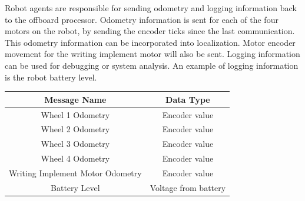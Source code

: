 Robot agents are responsible for sending odometry and logging information back to the offboard processor. Odometry information is sent for each of the four motors on the robot, by sending the encoder ticks since the last communication. This odometry information can be incorporated into localization. Motor encoder movement for the writing implement motor will also be sent. Logging information can be used for debugging or system analysis. An example of logging information is the robot battery level.  \\
\begin{center}
 \begin{tabular}{||c c ||}
 \hline
 Message Name & Data Type \\ [0.5ex]
 \hline\hline
 Wheel 1 Odometry & Encoder value \\
 \hline
 Wheel 2 Odometry & Encoder value \\
 \hline
 Wheel 3 Odometry & Encoder value \\
 \hline
 Wheel 4 Odometry & Encoder value \\
 \hline
 Writing Implement Motor Odometry & Encoder value \\
 \hline
 Battery Level & Voltage from battery \\
 \hline
\end{tabular}
\end{center}


